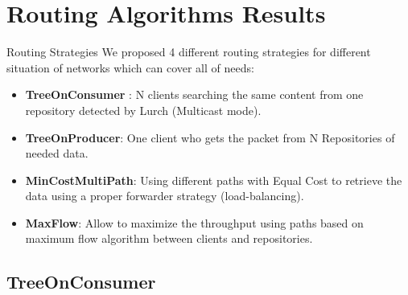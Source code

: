 \documentclass[8pt]{beamer}
\newcommand{\1}{\mathbbm 1}
\begin{document}
\section{Routing Algorithms Results}
\begin{frame}{Routing Strategies}
We proposed 4 different routing strategies for different situation of networks which can cover all of needs:
\begin{itemize}

\item \textbf{TreeOnConsumer} : N clients searching the same content from one repository detected by Lurch (Multicast mode).

\item \textbf{TreeOnProducer}: One client who gets the packet from N Repositories of needed data.

\item \textbf{MinCostMultiPath}: Using different paths with Equal Cost to retrieve the data using a proper forwarder strategy (load-balancing).

\item \textbf{MaxFlow}: Allow to maximize the throughput using paths based on maximum flow algorithm between clients and repositories.

\end{itemize}
\end{frame}

\subsection{TreeOnConsumer}
\end{document}
